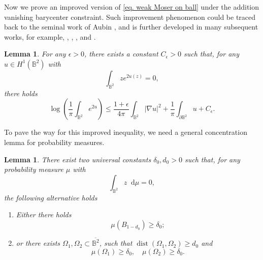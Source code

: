 \documentclass[11pt,a4paper,twoside]{amsart}
\newtheorem{lemma}[theorem]{Lemma}
\newtheorem{sketch proof}{Sketch of the proof}[section]
\newcommand{\dd}{\mathop{}\!\mathrm{d}}
\begin{document}
    Now we prove an improved version of \cref{eq. weak Moser on ball} under the addition vanishing barycenter constraint. Such improvement phenomenon could be traced back to the seminal work of Aubin \cite{Aub79}, and is further developed in many subsequent works, for example, \cite[Theorem 2.1]{CL91}, 
    \cite[Lemma 2.3]{Wan01},
    \cite[Proposition 2.2]{MR11}, 
    and \cite[Lemma 2.4]{L-SR16}.
    \begin{lemma}\label{lem. improved weak Moser on ball}
        For any $\epsilon>0$, there exists a constant $C_\epsilon>0$ such that, for any $u\in H^1(\mathbb{B}^2)$ with 
        \[
        \int_{\mathbb{B}^2}ze^{2u(z)}=0,
        \]
        there holds
        \[
        \log\left(
        \frac{1}{\pi}\int_{\mathbb{B}^2}e^{2u}
        \right)
        \leq \frac{1+\epsilon}{4\pi}\int_{\mathbb{B}^2}
        |\nabla u|^2
        +\frac{1}{\pi}
        \int_{\partial\mathbb{B}^2} u
        +C_\epsilon.
        \]
    \end{lemma}
    To pave the way for this improved inequality, we need a general concentration lemma for probability measures.
    \begin{lemma}\label{lem. concentration for measures}
        There exist two universal constants $\delta_0, d_0>0$ such that, for any probability measure $\mu$ with 
        \[
        \int_{\mathbb{B}^2}z\dd \mu=0,
        \]
        the following alternative holds
        \begin{enumerate}
            \item Either there holds
            \[
            \mu(B_{1-d_0})\geq \delta_0;
            \]
            \item or there exists $\Omega_1,\Omega_2\subset \overline{\mathbb{B}^2}$, such that $\operatorname{dist}(\Omega_1,\Omega_2)\geq d_0$ and
            \[
            \mu(\Omega_1)\geq \delta_0,
            \quad 
            \mu(\Omega_2)\geq \delta_0.
            \]
        \end{enumerate}
    \end{lemma}
\end{document}
